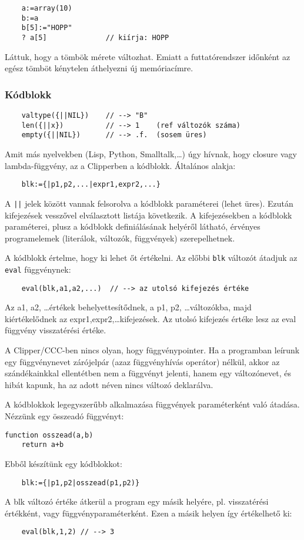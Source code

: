 \begin{verbatim}
    a:=array(10)
    b:=a
    b[5]:="HOPP"
    ? a[5]              // kiírja: HOPP
\end{verbatim}


Láttuk, hogy a tömbök mérete változhat. 
Emiatt a futtatórendszer időnként az egész tömböt 
kénytelen áthelyezni új memóriacímre.

\subsubsection{Kódblokk}

\begin{verbatim}
    valtype({||NIL})    // --> "B"
    len({||x})          // --> 1    (ref változók száma)
    empty({||NIL})      // --> .f.  (sosem üres)
\end{verbatim}

Amit más nyelvekben (Lisp, Python, Smalltalk,\ldots) úgy hívnak, hogy closure vagy
lambda-függvény, az a Clipperben a kódblokk. Általános alakja: 
\begin{verbatim}
    blk:={|p1,p2,...|expr1,expr2,...}
\end{verbatim}
A \verb!||! jelek között vannak felsorolva a kódblokk paraméterei (lehet üres).
Ezután kifejezések vesszővel elválasztott listája következik. A kifejezésekben 
a kódblokk paraméterei, plusz a kódblokk definiálásának helyéről látható, érvényes
programelemek (literálok, változók, függvények) szerepelhetnek. 

A kódblokk értelme, hogy ki lehet őt értékelni. Az előbbi \verb!blk!
változót átadjuk az \verb!eval! függvénynek:
\begin{verbatim}
    eval(blk,a1,a2,...)  // --> az utolsó kifejezés értéke
\end{verbatim}
Az a1, a2, \ldots értékek behelyettesítődnek, a p1, p2, \ldots változókba,
majd kiértékelődnek az expr1,expr2,\ldots kifejezések. Az utolsó kifejezés
értéke lesz az eval függvény visszatérési értéke.

A Clipper/CCC-ben nincs olyan, hogy függvénypointer. Ha a programban leírunk 
egy függvénynevet  zárójelpár (azaz függvényhívás operátor) nélkül, 
akkor az szándékainkkal ellentétben nem a függvényt jelenti, hanem egy változónevet, 
és hibát kapunk, ha az adott néven nincs változó deklarálva. 

A kódblokkok legegyszerűbb alkalmazása függvények paraméterként való átadása.
Nézzünk egy összeadó függvényt:
\begin{verbatim}
function osszead(a,b)
    return a+b
\end{verbatim}
Ebből készítünk egy kódblokkot:
\begin{verbatim}
    blk:={|p1,p2|osszead(p1,p2)}
\end{verbatim}
A blk változó értéke átkerül a program egy másik helyére, 
pl. visszatérési értékként, vagy függvény\-paraméterként. 
Ezen a másik helyen így értékelhető ki:
\begin{verbatim}
    eval(blk,1,2) // --> 3
\end{verbatim}


